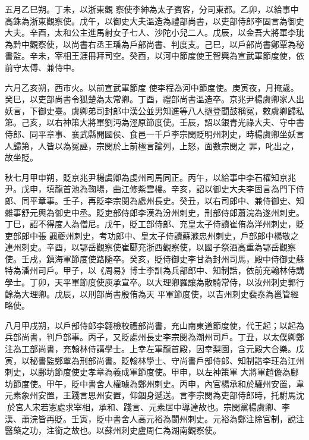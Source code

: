 \begin{pinyinscope}
 五月乙巳朔。丁未，以浙東觀
 察使李紳為太子賓客，分司東都。乙卯，以給事中高銖為浙東觀察使。戊午，以御史大夫溫造為禮部尚書，以吏部侍郎李固言為御史大夫。辛酉，太和公主進馬射女子七人、沙陀小兒二人。戊辰，以金吾大將軍李玼為黔中觀察使，以尚書右丞王璠為戶部尚書、判度支。己巳，以戶部尚書鄭覃為秘書監。辛未，宰相王涯冊拜司空。癸酉，以河中節度使王智興為宣武軍節度使，依前守太傅、兼侍中。



 六月乙亥朔，西市火。以前宣武軍節度
 使李程為河中節度使。庚寅夜，月掩歲。癸巳，以吏部尚書令狐楚為太常卿。丁酉，禮部尚書溫造卒。京兆尹楊虞卿家人出妖言，下御史臺。虞卿弟司封郎中漢公並男知進等八人撾登聞鼓稱冤，敕虞卿歸私第。己亥，以右神策大將軍劉沔為涇原節度使。壬辰，詔以銀青光祿大夫、守中書侍郎、同平章事、襄武縣開國侯、食邑一千戶李宗閔貶明州刺史，時楊虞卿坐妖言人歸第，人皆以為冤誣，宗閔於上前極言論列，上怒，面數宗閔之
 罪，叱出之，故坐貶。



 秋七月甲申朔，貶京兆尹楊虞卿為虔州司馬同正。丙午，以給事中李石權知京兆尹。戊申，填龍首池為鞠場，曲江修紫雲樓。辛亥，詔以御史大夫李固言為門下侍郎、同平章事。壬子，再貶李宗閔為處州長史。癸丑，以右司郎中、兼侍御史、知雜事舒元輿為御史中丞。貶吏部侍郎李漢為汾州刺史，刑部侍郎蕭浣為遂州刺史。丁巳，詔不得度人為僧尼。戊午，貶工部侍郎、充皇太子侍讀崔侑為洋州刺史，貶吏部郎中張
 諷夔州刺史，考功郎中、皇太子侍讀蘇滌忠州刺史，戶部郎中楊敬之連州刺史。辛酉，以鄂岳觀察使崔郾充浙西觀察使，以國子祭酒高重為鄂岳觀察使。壬戌，鎮海軍節度使路隨卒。癸亥，貶侍御史李甘為封州司馬，殿中侍御史蘇特為潘州司戶。甲子，以《周易》博士李訓為兵部郎中、知制誥，依前充翰林侍講學士。丁卯，天平軍節度使庾承宣卒。以大理卿羅讓為散騎常侍，以汝州刺史郭行餘為大理卿。戊辰，以刑部尚書殷侑為天
 平軍節度使，以吉州刺史裴泰為邕管經略使。



 八月甲戌朔，以戶部侍郎李翱檢校禮部尚書，充山南東道節度使，代王起；以起為兵部尚書，判戶部事。丙子，又貶處州長史李宗閔為潮州司戶。丁丑，以太僕卿鄭注為工部尚書，充翰林侍講學士。上幸左軍龍首殿，因幸梨園，含元殿大合樂。戊寅，以秘書監鄭覃為刑部尚書。貶翰林學士、守尚書戶部侍郎、知制誥李玨為江州刺史，以鄜坊節度使史孝章為義成軍節度使。甲申，以左神策軍
 大將軍趙儋為鄜坊節度使。甲午，貶中書舍人權璩為鄭州刺史。丙申，內官楊承和於驩州安置，韋元素象州安置，王踐言思州安置，仰錮身遞送。言李宗閔為吏部侍郎時，托駙馬沈於宮人宋若憲處求宰相，承和、踐言、元素居中導達故也。宗閔黨楊虞卿、李漢、蕭浣皆再貶。壬寅，貶中書舍人高元裕為閬州刺史。元裕為鄭注除官制，說注醫藥之功，注銜之故也。以蘇州刺史盧周仁為湖南觀察使。




\end{pinyinscope}
